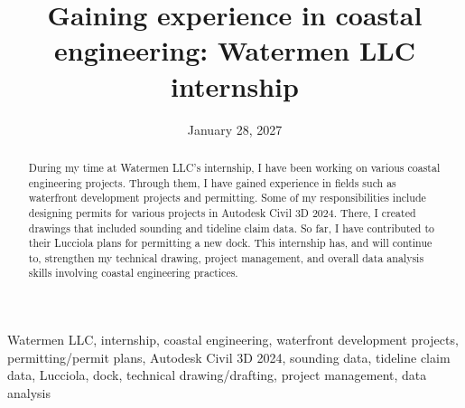 \documentclass[12pt,conference,onecolumn]{IEEEtran}
\title{Gaining experience in coastal engineering: {Watermen LLC} internship}
\author{%
\IEEEauthorblockN{Julia Bawar}\IEEEauthorblockA{Science \& Engineering\\Manalapan High School\\Englishtown, NJ\\\href{mailto:427jbawar@frhsd.com}{427jbawar@frhsd.com}}
}
\date{January 28, 2027}
\newcommand{\keywords}{Watermen LLC, internship, coastal engineering, waterfront development projects, permitting/permit plans, Autodesk Civil 3D 2024, sounding data, tideline claim data, Lucciola, dock, technical drawing/drafting, project management, data analysis}
\begin{document}
\maketitle 

\begin{abstract}
During my time at Watermen LLC’s internship, I have been working on various coastal engineering projects. Through them, I have gained experience in fields such as waterfront development projects and permitting. Some of my responsibilities include designing permits for various projects in Autodesk Civil 3D 2024. There, I created drawings that included sounding and tideline claim data. So far, I have contributed to their Lucciola plans for permitting a new dock. This internship has, and will continue to, strengthen my technical drawing, project management, and overall data analysis skills involving coastal engineering practices. 
\end{abstract}

\begin{IEEEkeywords}
\keywords
\end{IEEEkeywords}
\end{document}
